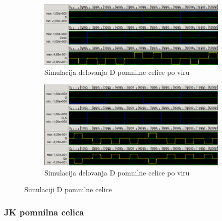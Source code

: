 \documentclass[a4paper, 11pt]{article}
\begin{document}
\begin{figure}[h!]
	\begin{subfigure}[b]{\textwidth}
	\includegraphics[width=\textwidth]{../img/vir_4/sim_d.png}
	\caption{Simulacija delovanja D pomnilne celice po viru \cite{quantum_dot}}
	\label{fig-d-1-sim}
	\end{subfigure}
	\begin{subfigure}[b]{\textwidth}
	\includegraphics[width=\textwidth]{../img/vir_5/sim_d.png}
	\caption{Simulacija delovanja D pomnilne celice po viru \cite{a_novel_approach}}
	\label{fig-d-2-sim}
	\end{subfigure}
	\caption{Simulaciji D pomnilne celice}
	\label{fig-d-sim}
\end{figure}

\subsubsection{JK pomnilna celica}
\end{document}
